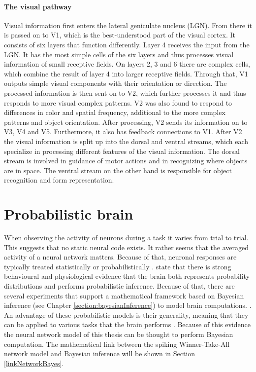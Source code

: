 \paragraph{The visual pathway} Visual information first enters the lateral geniculate nucleus (LGN). From there it is passed on to V1, which is the best-understood part of the visual cortex. It consists of six layers that function differently. Layer 4 receives the input from the LGN. It has the most simple cells of the six layers and thus processes visual information of small receptive fields. On layers 2, 3 and 6 there are complex cells, which combine the result of layer 4 into larger receptive fields. Through that, V1 outputs simple visual components with their orientation or direction. The processed information is then sent on to V2, which further processes it and thus responds to more visual complex patterns. V2 was also found to respond to differences in color and spatial frequency, additional to the more complex patterns and object orientation. After processing, V2 sends its information on to V3, V4 and V5. Furthermore, it also has feedback connections to V1. After V2 the visual information is split up into the dorsal and ventral streams, which each specialize in processing different features of the visual information. The dorsal stream is involved in guidance of motor actions and in recognizing where objects are in space. The ventral stream on the other hand is responsible for object recognition and form representation.
\citep{visualCortexBook}

\section{Probabilistic brain}
\label{sec:probabilisticBrain}

When observing the activity of neurons during a task it varies from trial to trial. This suggests that no static neural code exists. It rather seems that the averaged activity of a neural network matters. Because of that, neuronal responses are typically treated statistically or probabilistically \citep{SpikingNeuronModelsBook}.  \citet{probabilisticBrain} state that there is strong behavioural and physiological evidence that the brain both represents probability distributions and performs probabilistic inference. Because of that, there are several experiments that support a mathematical framework based on Bayesian inference (see Chapter \ref{section:bayesianInference}) to model brain computations. \citep{neuralSubstrate, HierachicalBayesVisualCortex, anatomyOfInference, neuralImplementationOfBayesionInferenceSensoryMotor}. An advantage of these probabilistic models is their generality, meaning that they can be applied to various tasks that the brain performs \citep{probabilisticBrain}. Because of this evidence the neural network model of this thesis can be thought to perform Bayesian computation. The mathematical link between the spiking Winner-Take-All network model and Bayesian inference will be shown in Section \ref{linkNetworkBayes}.

